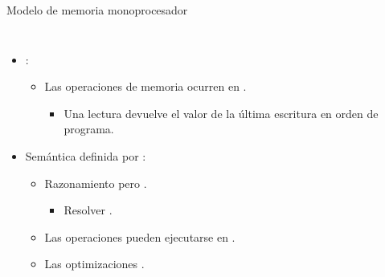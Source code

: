\begin{frame}[t]{Modelo de memoria monoprocesador}

\begin{columns}


\makebox[\textwidth][c]{}


\begin{itemize}
  \item {}:
    \begin{itemize}
      \item Las operaciones de memoria ocurren en .
        \begin{itemize}
          \item Una lectura devuelve el valor de la última escritura en orden de programa.
        \end{itemize}
    \end{itemize}
  \item Semántica definida por :
    \begin{itemize}
      \item Razonamiento  pero .
        \begin{itemize}
          \item Resolver .
        \end{itemize}
      \item Las operaciones  pueden ejecutarse en .
      \item Las optimizaciones .
    \end{itemize}
\end{itemize}

\end{columns}

\end{frame}
